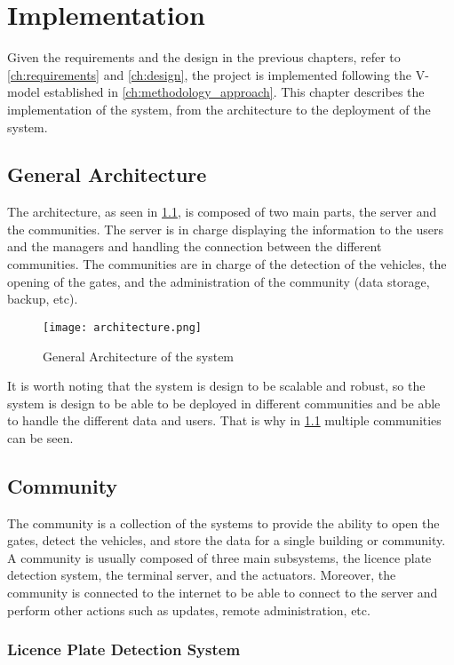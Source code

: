 \chapter{Implementation}\label{ch:implementation}

Given the requirements and the design in the previous chapters, refer to \cref{ch:requirements} and \cref{ch:design}, the project is implemented following the V-model established in \cref{ch:methodology_approach}. This chapter describes the implementation of the system, from the architecture to the deployment of the system.

\section{General Architecture}

The architecture, as seen in \cref{fig:architecture}, is composed of two main parts, the server and the communities. The server is in charge displaying the information to the users and the managers and handling the connection between the different communities. The communities are in charge of the detection of the vehicles, the opening of the gates, and the administration of the community (data storage, backup, etc).

\begin{figure}
	\texttt{[image: architecture.png]}
	\caption{General Architecture of the system}\label{fig:architecture}
\end{figure}

It is worth noting that the system is design to be scalable and robust, so the system is design to be able to be deployed in different communities and be able to handle the different data and users. That is why in \cref{fig:architecture} multiple communities can be seen.

\section{Community}

The community is a collection of the systems to provide the ability to open the gates, detect the vehicles, and store the data for a single building or community. A community is usually composed of three main subsystems, the licence plate detection system, the terminal server, and the actuators. Moreover, the community is connected to the internet to be able to connect to the server and perform other actions such as updates, remote administration, etc.

\subsection{Licence Plate Detection System}

